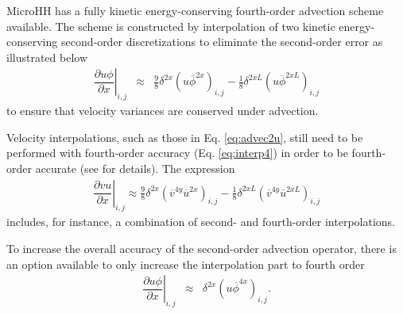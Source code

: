 \documentclass[gmd,manuscript]{copernicus}
\begin{document}
MicroHH has a fully kinetic energy-conserving fourth-order advection scheme \citep{Morinishi1998} available. The scheme is constructed by interpolation of two kinetic energy-conserving second-order discretizations to eliminate the second-order error as illustrated below
\begin{eqnarray}
\left. \dfrac{\partial u \phi}{\partial x} \right|_{i,j} & \approx & \frac{9}{8} \delta^{2x} \left( u \overline{\phi}^{2x} \right)_{i,j} 
                                                             - \frac{1}{8} \delta^{2xL} \left( u \overline{\phi}^{2xL} \right)_{i,j}%
\end{eqnarray}
to ensure that velocity variances are conserved under advection.

Velocity interpolations, such as those in Eq. \ref{eq:advec2u}, still need to be performed with fourth-order accuracy (Eq. \ref{eq:interp4}) in order to  be fourth-order accurate (see \citet{Morinishi1998} for details). The expression
\begin{eqnarray}
\left. \dfrac{\partial v u}{\partial x}\right|_{i,j} \approx \frac{9}{8} \delta^{2x} \left( \overline{v}^{4y} \overline{u}^{2x} \right)_{i,j} 
                                       - \frac{1}{8} \delta^{2xL} \left( \overline{v}^{4y} \overline{u}^{2xL} \right)_{i,j}
\end{eqnarray}
includes, for instance, a combination of second- and fourth-order interpolations.

To increase the overall accuracy of the second-order advection operator, there is an option available to only increase the interpolation part to fourth order
\begin{eqnarray}
\left. \dfrac{\partial u \phi}{\partial x}\right|_{i,j}
& \approx & 
\delta^{2x} \left( u \overline{\phi}^{4x} \right)_{i,j}.
\end{eqnarray}
\end{document}

